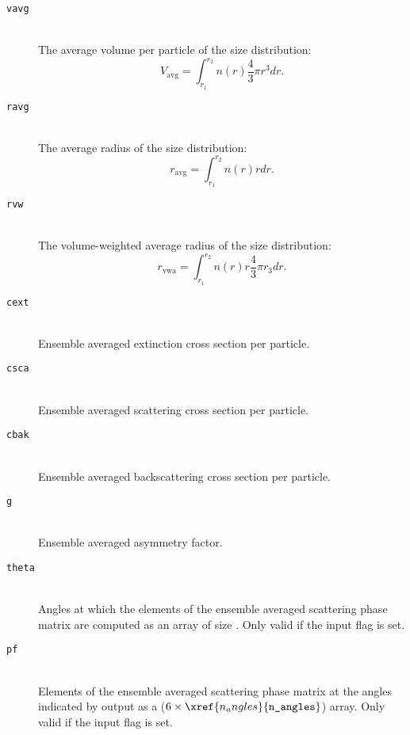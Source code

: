 \begin{description}
\item[\texttt{vavg}] \hfill \\
The average volume per particle of the size distribution:
\begin{equation}
V_{\mathrm{avg}} = \int^{r_2}_{r_{1}} n(r) \frac{4}{3} \pi r^{3} dr.
\label{eq:lmie_outputs_vavg}
\end{equation}

\item[\texttt{ravg}] \hfill \\
The average radius of the size distribution:
\begin{equation}
r_{\mathrm{avg}} = \int^{r_2}_{r_{1}} n(r) r dr.
\label{eq:lmie_outputs_ravg}
\end{equation}

\item[\texttt{rvw}] \hfill \\
The volume-weighted average radius of the size distribution:
\begin{equation}
r_{\mathrm{vwa}} = \int^{r_2}_{r_{1}} n(r) r \frac{4}{3} \pi r_{3} dr.
\label{eq:lmie_outputs_rvw}
\end{equation}

\item[\texttt{cext}] \hfill \\
Ensemble averaged extinction cross section per particle.

\item[\texttt{csca}] \hfill \\
Ensemble averaged scattering cross section per particle.

\item[\texttt{cbak}] \hfill \\
Ensemble averaged backscattering cross section per particle.

\item[\texttt{g}] \hfill \\
Ensemble averaged asymmetry factor.

\item[\texttt{theta}] \hfill \\
Angles at which the elements of the ensemble averaged scattering phase matrix are computed as an array of size .  Only valid if the input flag  is set.

\item[\texttt{pf}] \hfill \\
Elements of the ensemble averaged scattering phase matrix at the angles indicated by output  as a ($6 \times \xref{n_angles}{\texttt{n\_angles}}$) array.  Only valid if the input flag  is set.


\end{description}
